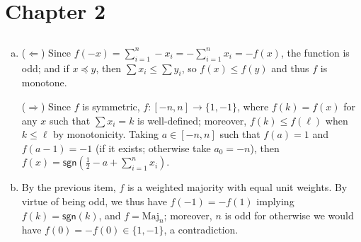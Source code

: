 \documentclass[12pt]{article}
\newcommand{\fbitset}{\{1,-1\}}
\begin{document}
\subsection{}

\subsection{}

\subsection{}

\subsection{}

\section{Chapter 2}

\subsection{}

\subsection{}

\subsection{}

\begin{enumerate}[(a)]
    \item ($\Longleftarrow$) Since $f(-x) = \sum_{i = 1}^n -x_i = - \sum_{i = 1}^n x_i = - f(x)$, the function is odd; and if $x \preceq y$, then $\sum x_i \leq \sum y_i$, so $f(x) \leq f(y)$ and thus $f$ is monotone.
    
    ($\Longrightarrow$) Since $f$ is symmetric, $f: [-n, n] \to \fbitset$, where $f(k) = f(x)$ for any $x$ such that $\sum x_i = k$ is well-defined; moreover, $f(k) \leq f(\ell)$ when $k \leq \ell$ by monotonicity. Taking $a \in [-n ,n]$ such that $f(a) = 1$ and $f(a - 1) = -1$ (if it exists; otherwise take $a_0 = -n$), then $f(x) = \textsf{sgn}\left(\frac1{2} - a + \sum_{i = 1}^n x_i\right)$.
    
    \item By the previous item, $f$ is a weighted majority with equal unit weights. By virtue of being odd, we thus have $f(-1) = -f(1)$ implying $f(k) = \textsf{sgn}(k)$, and $f = \text{Maj}_n$; moreover, $n$ is odd for otherwise we would have $f(0) = -f(0) \in \fbitset$, a contradiction.
\end{enumerate}
\end{document}
